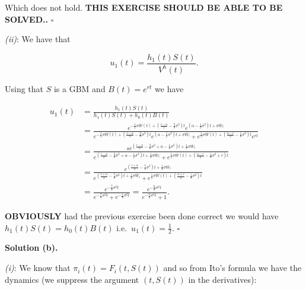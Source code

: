 \documentclass[
]{article}
\begin{document}
Which does not hold. \textbf{THIS EXERCISE SHOULD BE ABLE TO BE
SOLVED..} \(\square\)

\emph{(ii)}: We have that

\[
u_1(t)=\frac{h_1(t)S(t)}{V^h(t)}.
\]

Using that \(S\) is a GBM and \(B(t)=e^{rt}\) we have

\begin{align*}
u_1(t)&=\frac{h_1(t)S(t)}{h_1(t)S(t)+h_0(t)B(t)}\\
&=\frac{e^{-\frac{1}{2}\sigma\overline{W}(t)+\left(\frac{r-\alpha}{2}-\frac{3}{8}\sigma^2\right)t}e^{\left(\alpha-\frac{1}{2}\sigma^2\right)t+\sigma \overline{W}_t}}{e^{-\frac{1}{2}\sigma\overline{W}(t)+\left(\frac{r-\alpha}{2}-\frac{3}{8}\sigma^2\right)t}e^{\left(\alpha-\frac{1}{2}\sigma^2\right)t+\sigma \overline{W}_t}+e^{\frac{1}{2}\sigma\overline{W}(t)+\left(\frac{\alpha - r}{2}-\frac{1}{8}\sigma^2\right)t}e^{rt}}\\
&=\frac{se^{\left(\frac{r-\alpha}{2}-\frac{3}{8}\sigma^2+\alpha-\frac{1}{2}\sigma^2\right)t+\frac{1}{2}\sigma \overline{W}_t}}{e^{\left(\frac{r-\alpha}{2}-\frac{3}{8}\sigma^2+\alpha-\frac{1}{2}\sigma^2\right)t+\frac{1}{2}\sigma \overline{W}_t}+e^{\frac{1}{2}\sigma\overline{W}(t)+\left(\frac{\alpha - r}{2}-\frac{1}{8}\sigma^2+r\right)t}}\\
&=\frac{e^{\left(\frac{r+\alpha}{2}-\frac{7}{8}\sigma^2\right)t+\frac{1}{2}\sigma \overline{W}_t}}{e^{\left(\frac{r+\alpha}{2}-\frac{7}{8}\sigma^2\right)t+\frac{1}{2}\sigma \overline{W}_t}+e^{\frac{1}{2}\sigma\overline{W}(t)+\left(\frac{\alpha + r}{2}-\frac{1}{8}\sigma^2\right)t}}\\
&=\frac{e^{-\frac{7}{8}\sigma^2t}}{e^{-\frac{7}{8}\sigma^2t}+e^{-\frac{1}{8}\sigma^2t}}=\frac{e^{-\frac{6}{8}\sigma^2t}}{e^{-\frac{6}{8}\sigma^2t}+1}.
\end{align*}

\textbf{OBVIOUSLY} had the previous exercise been done correct we would
have \(h_1(t)S(t)=h_0(t)B(t)\) i.e.~\(u_1(t)=\frac{1}{2}\). \(\square\)

\textbf{Solution (b).}

\emph{(i)}: We know that \(\pi_i(t)=F_i(t,S(t))\) and so from Ito's
formula we have the dynamics (we suppress the argument \((t,S(t))\) in
the derivatives):
\end{document}
